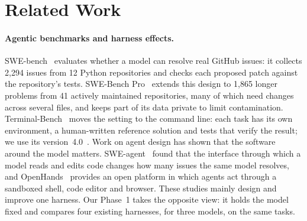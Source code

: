 \section{Related Work}
\label{sec:related}

\paragraph{Agentic benchmarks and harness effects.}
SWE-bench~\cite{jimenez2024swebench} evaluates whether a model can resolve real GitHub issues: it collects 2,294
issues from 12 Python repositories and checks each proposed patch against the repository's tests. SWE-Bench
Pro~\cite{deng2025sweprobench} extends this design to 1,865 longer problems from 41 actively maintained
repositories, many of which need changes across several files, and keeps part of its data private to limit
contamination. Terminal-Bench~\cite{merrill2026terminalbench} moves the setting to the command line: each task
has its own environment, a human-written reference solution and tests that verify the result; we use its
version~4.0~\cite{tb4}. Work on agent design has shown that the software around the model matters.
SWE-agent~\cite{yang2024sweagent} found that the interface through which a model reads and edits code changes
how many issues the same model resolves, and OpenHands~\cite{wang2025openhands} provides an open platform in which
agents act through a sandboxed shell, code editor and browser. These studies mainly design and improve one
harness. Our Phase~1 takes the opposite view: it holds the model fixed and compares four existing
harnesses, for three models, on the same tasks.

